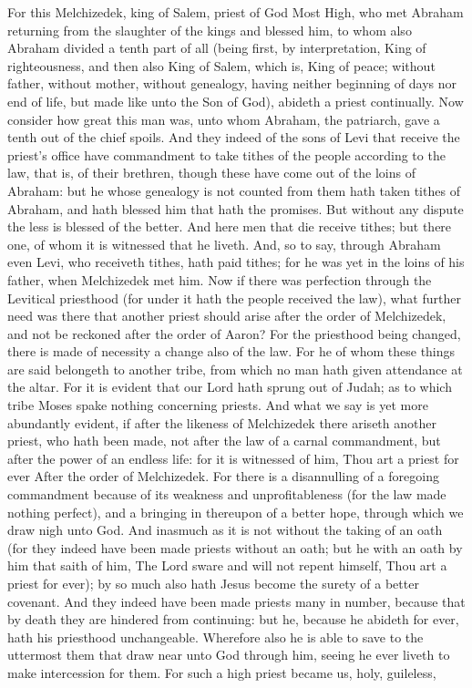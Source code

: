 For this Melchizedek, king of Salem, priest of God Most High, who met Abraham returning from the slaughter of the kings and blessed him, to whom also Abraham divided a tenth part of all (being first, by interpretation, King of righteousness, and then also King of Salem, which is, King of peace; without father, without mother, without genealogy, having neither beginning of days nor end of life, but made like unto the Son of God), abideth a priest continually.  Now consider how great this man was, unto whom Abraham, the patriarch, gave a tenth out of the chief spoils. And they indeed of the sons of Levi that receive the priest’s office have commandment to take tithes of the people according to the law, that is, of their brethren, though these have come out of the loins of Abraham: but he whose genealogy is not counted from them hath taken tithes of Abraham, and hath blessed him that hath the promises. But without any dispute the less is blessed of the better. And here men that die receive tithes; but there one, of whom it is witnessed that he liveth. And, so to say, through Abraham even Levi, who receiveth tithes, hath paid tithes; for he was yet in the loins of his father, when Melchizedek met him.  Now if there was perfection through the Levitical priesthood (for under it hath the people received the law), what further need was there that another priest should arise after the order of Melchizedek, and not be reckoned after the order of Aaron? For the priesthood being changed, there is made of necessity a change also of the law. For he of whom these things are said belongeth to another tribe, from which no man hath given attendance at the altar. For it is evident that our Lord hath sprung out of Judah; as to which tribe Moses spake nothing concerning priests. And what we say is yet more abundantly evident, if after the likeness of Melchizedek there ariseth another priest, who hath been made, not after the law of a carnal commandment, but after the power of an endless life: for it is witnessed of him, Thou art a priest for ever After the order of Melchizedek.  For there is a disannulling of a foregoing commandment because of its weakness and unprofitableness (for the law made nothing perfect), and a bringing in thereupon of a better hope, through which we draw nigh unto God. And inasmuch as it is not without the taking of an oath (for they indeed have been made priests without an oath; but he with an oath by him that saith of him, The Lord sware and will not repent himself, Thou art a priest for ever);  by so much also hath Jesus become the surety of a better covenant. And they indeed have been made priests many in number, because that by death they are hindered from continuing: but he, because he abideth for ever, hath his priesthood unchangeable. Wherefore also he is able to save to the uttermost them that draw near unto God through him, seeing he ever liveth to make intercession for them.  For such a high priest became us, holy, guileless, 